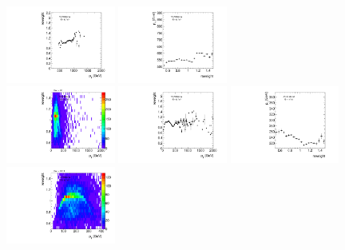 \begin{figure}[htbp!]
\begin{center}
\includegraphics[angle=270, width=0.32\textwidth]{./figures/boosted/AppendixReweight/Weights/3Trk_Sideband_leadHCand_Pt_m_weight_profx.pdf}
\includegraphics[angle=270, width=0.32\textwidth]{./figures/boosted/AppendixReweight/Weights/3Trk_Sideband_leadHCand_Pt_m_weight_profy.pdf}\\
\includegraphics[angle=270, width=0.32\textwidth]{./figures/boosted/AppendixReweight/Weights/3Trk_Sideband_leadHCand_trk0_Pt_weight.pdf}
\includegraphics[angle=270, width=0.32\textwidth]{./figures/boosted/AppendixReweight/Weights/3Trk_Sideband_leadHCand_trk0_Pt_weight_profx.pdf}
\includegraphics[angle=270, width=0.32\textwidth]{./figures/boosted/AppendixReweight/Weights/3Trk_Sideband_leadHCand_trk0_Pt_weight_profy.pdf}\\
\includegraphics[angle=270, width=0.32\textwidth]{./figures/boosted/AppendixReweight/Weights/3Trk_Sideband_sublHCand_trk0_Pt_weight.pdf}

\end{center}
\end{figure}
